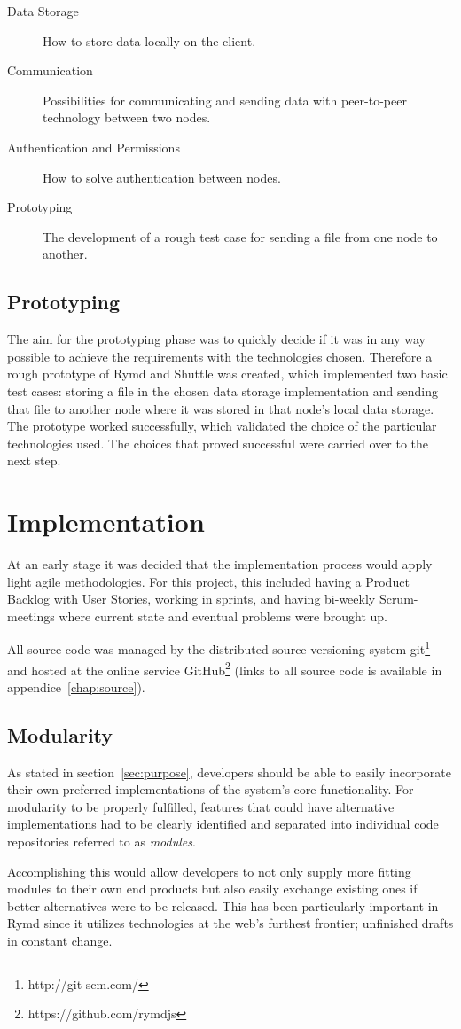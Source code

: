 \begin{description}
  \item[Data Storage] How to store data locally on the client.
  \item[Communication] Possibilities for communicating and sending data with peer-to-peer technology between two nodes.
  \item[Authentication and Permissions] How to solve authentication between nodes.
  \item[Prototyping] The development of a rough test case for sending a file from one node to another.
\end{description}

\subsection{Prototyping}

The aim for the prototyping phase was to quickly decide if it was in any way possible to achieve the requirements with the technologies chosen. Therefore a rough prototype of Rymd and Shuttle was created, which implemented two basic test cases: storing a file in the chosen data storage implementation and sending that file to another node where it was stored in that node's local data storage. The prototype worked successfully, which validated the choice of  the particular technologies used. The choices that proved successful were carried over to the next step.

\section{Implementation}

At an early stage it was decided that the implementation process would apply light agile methodologies. For this project, this included having a Product Backlog with User Stories, working in sprints, and having bi-weekly Scrum-meetings where current state and eventual problems were brought up.

All source code was managed by the distributed source versioning system git\footnote{http://git-scm.com/} and hosted at the online service GitHub\footnote{https://github.com/rymdjs} (links to all source code is available in appendice~\ref{chap:source}).

\subsection{Modularity}
\label{sec:modularity}

As stated in section~\ref{sec:purpose}, developers should be able to easily incorporate their own preferred implementations of the system's core functionality. For modularity to be properly fulfilled, features that could have alternative implementations had to be clearly identified and separated into individual code repositories referred to as \emph{modules}.

Accomplishing this would allow developers to not only supply more fitting modules to their own end products but also easily exchange existing ones if better alternatives were to be released. This has been particularly important in Rymd since it utilizes technologies at the web's furthest frontier; unfinished drafts in constant change.
